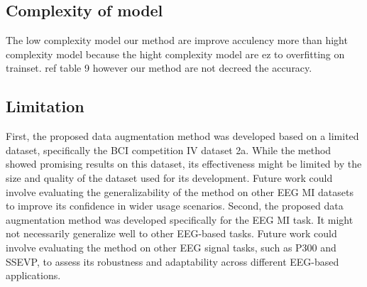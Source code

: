 \documentclass[runningheads]{llncs}
\begin{document}
\begin{table}[ht] 
\centering
\caption{ The Average accuracy improvement from our method.}\label{table: The Average accuracy improvement from our method}
\end{table}

\subsection{Complexity of model}

The low complexity model our method are improve acculency more than hight complexity model because the hight complexity model are ez to overfitting on trainset. ref table 9  however our method are not decreed the accuracy. 


\subsection{Limitation}
First, the proposed data augmentation method was developed based on a limited dataset, specifically the BCI competition IV dataset 2a. While the method showed promising results on this dataset, its effectiveness might be limited by the size and quality of the dataset used for its development. Future work could involve evaluating the generalizability of the method on other EEG MI datasets to improve its confidence in wider usage scenarios.  Second, the proposed data augmentation method was developed specifically for the EEG MI task. It might not necessarily generalize well to other EEG-based tasks. Future work could involve evaluating the method on other EEG signal tasks, such as P300 and SSEVP, to assess its robustness and adaptability across different EEG-based applications.
\end{document}
